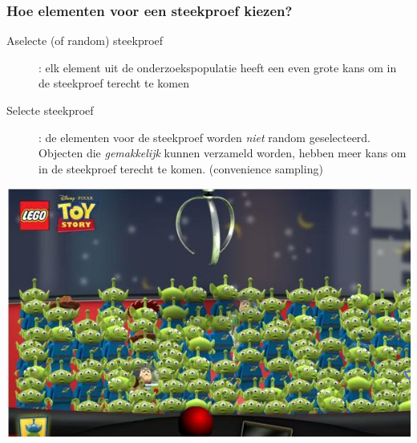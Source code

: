 \documentclass{beamer}
\begin{document}
\begin{frame}
  \frametitle{Hoe elementen voor een steekproef kiezen?}

  \begin{description}
    \item[Aselecte (of random) steekproef]: elk element uit de onderzoekspopulatie heeft een even grote kans om in de steekproef terecht te komen
    \item[Selecte steekproef]: de elementen voor de steekproef worden \textit{niet} random geselecteerd.
    Objecten die \textit{gemakkelijk} kunnen verzameld worden, hebben meer kans om in de steekproef terecht te komen.
    (convenience sampling)
  \end{description}

  \begin{center}
    \includegraphics[width=.5\textwidth]{img/les4-aselect}
  \end{center}
\end{frame}
\end{document}
